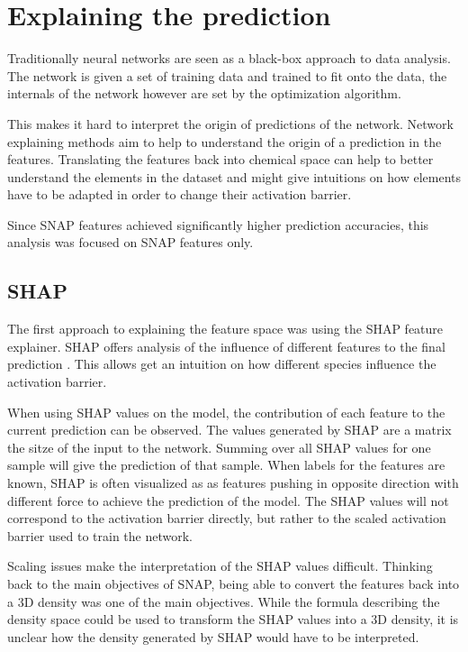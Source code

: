 \section{Explaining the prediction}

Traditionally neural networks are seen as a black-box approach to data analysis.
The network is given a set of training data and trained to fit onto the data,
the internals of the network however are set by the optimization algorithm.

This makes it hard to interpret the origin of predictions of the network.
Network explaining methods aim to help to understand the origin of a prediction in the features.
Translating the features back into chemical space can help to better understand 
the elements in the dataset and might give intuitions on how elements have to be adapted in order to change their activation barrier.

Since SNAP features achieved significantly higher prediction accuracies,
this analysis was focused on SNAP features only.

\subsection{SHAP}

The first approach to explaining the feature space was using the SHAP feature explainer.
SHAP offers analysis of the influence of different features to the final prediction \cite{NIPS2017_7062}.
This allows get an intuition on how different species influence the activation barrier.

When using SHAP values on the model, the contribution of each feature to the current prediction can be observed.
The values generated by SHAP are a matrix the sitze of the input to the network.
Summing over all SHAP values for one sample will give the prediction of that sample.
When labels for the features are  known, SHAP is often visualized as as features pushing in opposite direction with different force 
to achieve the prediction of the model.
The SHAP values will not correspond to the activation barrier directly,
but rather to the scaled activation barrier used to train the network.

Scaling issues make the interpretation of the SHAP values difficult.
Thinking back to the main objectives of SNAP, being able to convert the features back into 
a 3D density was one of the main objectives.
While the formula describing the density space could be used to transform the SHAP values 
into a 3D density, it is unclear how the density generated by SHAP would have to be interpreted.

